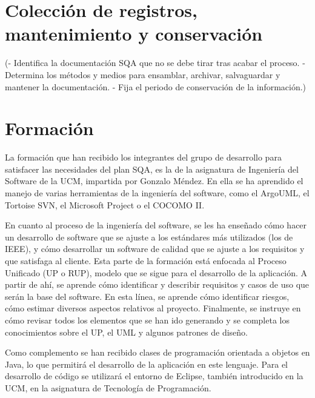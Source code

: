 \documentclass[spanish,a4paper,11pt, twoside]{report}	%
\begin{document}
\newpage
\mbox{}
\thispagestyle{empty}						%
\newpage

\chapter{ Colección de registros, mantenimiento y conservación}
	(- Identifica la documentación SQA que no se debe
	tirar tras acabar el proceso.
	- Determina los métodos y medios para ensamblar,
	archivar, salvaguardar y mantener la documentación.
	- Fija el periodo de conservación de la información.)

\newpage
\mbox{}
\thispagestyle{empty}						%
\newpage

\chapter{ \hspace{0.25cm}Formación}

	La formación que han recibido los integrantes del grupo de desarrollo para satisfacer las necesidades del plan SQA, es la de la asignatura de Ingeniería del Software de la UCM, impartida por Gonzalo Méndez. En ella se ha aprendido el manejo de varias herramientas de la ingeniería del software, como el ArgoUML, el Tortoise SVN, el Microsoft Project o el COCOMO II. 

	En cuanto al proceso de la ingeniería del software, se les ha enseñado cómo hacer un desarrollo de software que se ajuste a los estándares más utilizados (los de IEEE), y cómo desarrollar un software de calidad que se ajuste a los requisitos y que satisfaga al cliente. Esta parte de la formación está enfocada al Proceso Unificado (UP o RUP), modelo que se sigue para el desarrollo de la aplicación. A partir de ahí, se aprende cómo identificar y describir requisitos y casos de uso que serán la base del software. En esta línea, se aprende cómo identificar riesgos, cómo estimar diversos aspectos relativos al proyecto. Finalmente, se instruye en cómo revisar todos los elementos que se han ido generando y se completa los conocimientos sobre el UP, el UML y algunos patrones de diseño.
	
	Como complemento se han recibido clases de programación orientada a objetos en Java, lo que permitirá el desarrollo de la aplicación en este lenguaje. Para el desarrollo de código se utilizará el entorno de Eclipse, también introducido en la UCM, en la asignatura de Tecnología de Programación.
\end{document}
